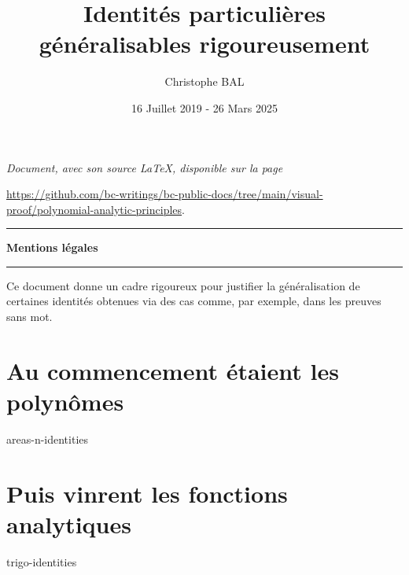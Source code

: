 \documentclass[12pt]{amsart}
\begin{document}
\title{Identités particulières généralisables rigoureusement}
\author{Christophe BAL}
\date{16 Juillet 2019 - 26 Mars 2025}

\maketitle

\begin{center}
	\itshape
	Document, avec son source \LaTeX, disponible sur la page

	\url{https://github.com/bc-writings/bc-public-docs/tree/main/visual-proof/polynomial-analytic-principles}.
\end{center}


\bigskip


\begin{center}
	\hrule\vspace{.3em}
	{
		\fontsize{1.35em}{1em}\selectfont
		\textbf{Mentions \og légales \fg}
	}

	\vspace{0.45em}
	\doclicenseThis
	\hrule
\end{center}


\bigskip


\setcounter{tocdepth}{1}
\tableofcontents




\begin{meta-abstract*}
	Ce document donne un cadre rigoureux pour justifier la généralisation de certaines identités obtenues via des cas  comme, par exemple, dans les preuves sans mot. 
\end{meta-abstract*}


\section{Au commencement étaient les polynômes}

{areas-n-identities}



\newpage

\section{Puis vinrent les fonctions analytiques}

{trigo-identities}
\end{document}
